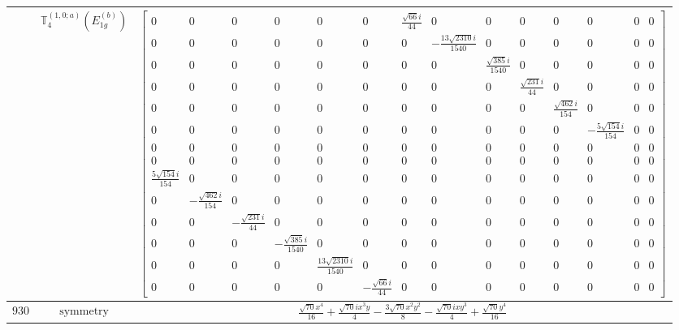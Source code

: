 \documentclass[fleqn,8pt,landscape]{jsarticle}
\begin{document}
\begin{longtable}{ccc}
$  $ & $ \mathbb{T}_{4}^{(1,0;a)}(E_{1g}^{(b)}) $ & $ \begin{bmatrix} 0 & 0 & 0 & 0 & 0 & 0 & \frac{\sqrt{66} i}{44} & 0 & 0 & 0 & 0 & 0 & 0 & 0 \\ 0 & 0 & 0 & 0 & 0 & 0 & 0 & - \frac{13 \sqrt{2310} i}{1540} & 0 & 0 & 0 & 0 & 0 & 0 \\ 0 & 0 & 0 & 0 & 0 & 0 & 0 & 0 & \frac{\sqrt{385} i}{1540} & 0 & 0 & 0 & 0 & 0 \\ 0 & 0 & 0 & 0 & 0 & 0 & 0 & 0 & 0 & \frac{\sqrt{231} i}{44} & 0 & 0 & 0 & 0 \\ 0 & 0 & 0 & 0 & 0 & 0 & 0 & 0 & 0 & 0 & \frac{\sqrt{462} i}{154} & 0 & 0 & 0 \\ 0 & 0 & 0 & 0 & 0 & 0 & 0 & 0 & 0 & 0 & 0 & - \frac{5 \sqrt{154} i}{154} & 0 & 0 \\ 0 & 0 & 0 & 0 & 0 & 0 & 0 & 0 & 0 & 0 & 0 & 0 & 0 & 0 \\ 0 & 0 & 0 & 0 & 0 & 0 & 0 & 0 & 0 & 0 & 0 & 0 & 0 & 0 \\ \frac{5 \sqrt{154} i}{154} & 0 & 0 & 0 & 0 & 0 & 0 & 0 & 0 & 0 & 0 & 0 & 0 & 0 \\ 0 & - \frac{\sqrt{462} i}{154} & 0 & 0 & 0 & 0 & 0 & 0 & 0 & 0 & 0 & 0 & 0 & 0 \\ 0 & 0 & - \frac{\sqrt{231} i}{44} & 0 & 0 & 0 & 0 & 0 & 0 & 0 & 0 & 0 & 0 & 0 \\ 0 & 0 & 0 & - \frac{\sqrt{385} i}{1540} & 0 & 0 & 0 & 0 & 0 & 0 & 0 & 0 & 0 & 0 \\ 0 & 0 & 0 & 0 & \frac{13 \sqrt{2310} i}{1540} & 0 & 0 & 0 & 0 & 0 & 0 & 0 & 0 & 0 \\ 0 & 0 & 0 & 0 & 0 & - \frac{\sqrt{66} i}{44} & 0 & 0 & 0 & 0 & 0 & 0 & 0 & 0 \end{bmatrix} $ \\ \hline
$ 930 $ & $ \text{symmetry} $ & $ \frac{\sqrt{70} x^{4}}{16} + \frac{\sqrt{70} i x^{3} y}{4} - \frac{3 \sqrt{70} x^{2} y^{2}}{8} - \frac{\sqrt{70} i x y^{3}}{4} + \frac{\sqrt{70} y^{4}}{16} $ \\

\end{longtable}
\end{document}
